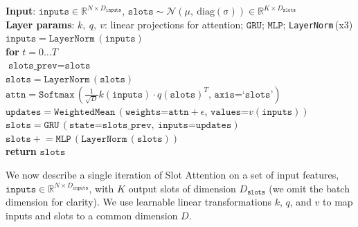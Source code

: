 \documentclass{article}
\newcommand{\softmax}[1]{\texttt{Softmax}\,(#1)}
\newcommand{\gru}[2]{\texttt{GRU}\,(#1, \ #2)}
\newcommand{\slots}[0]{\texttt{slots}}
\newcommand{\attn}[0]{\texttt{attn}}
\newcommand{\inp}[0]{\texttt{inputs}}
\newcommand{\mlp}[0]{\texttt{MLP}}
\newcommand{\updates}[0]{\texttt{updates}}
\newcommand{\layernorm}[0]{\texttt{LayerNorm}}
\begin{document}
\begin{algorithm}[t!]
\caption{Slot Attention module. The input is a set of $N$ vectors of dimension $D_{\inp}$ which is mapped to a set of $K$ slots of dimension $D_{\slots}$. We initialize the slots by sampling their initial values as independent samples from a Gaussian distribution with shared, learnable parameters $\mu\in\mathbb{R}^{D_{\slots}}$ and $\sigma\in\mathbb{R}^{D_{\slots}}$. In our experiments we set the number of iterations to $T=3$.}\label{algo:slot_attention}
\begin{algorithmic}[1]

  \STATE \textbf{Input}: $\inp\in\mathbb{R}^{N \times D_{\inp}}$, $\slots \sim \mathcal{N}(\mu, \ \mathrm{diag(\sigma)})\in\mathbb{R}^{K \times D_{\slots}}$\\[0.2em]
  \STATE \textbf{Layer params}: $k, \ q, \ v$: linear projections for attention; $\texttt{GRU}$; $\texttt{MLP}$;  \layernorm \,(x3)\\[0.2em]
  \STATE \quad $\inp = \layernorm\,(\inp)$\label{algo_step:norm_input}\\[0.2em]
  \STATE \quad \textbf{for} $t = 0\ldots T$ \\[0.2em]
  \STATE \qquad $\slots\texttt{\_prev} = \slots$\\[0.2em]
  \STATE \qquad $\slots = \layernorm\,(\slots)$\\[0.2em]
  \STATE \qquad $\attn = \softmax{\frac{1}{\sqrt{D}} k(\inp) \cdot q(\slots)^T,\,\texttt{axis=`slots'}} $  \hfill{}\label{algo_step:softmax}
  \STATE \qquad $\updates = \texttt{WeightedMean}\,(\texttt{weights=}\texttt{attn}+\epsilon,\,\texttt{values=}v(\inp))$  \hfill{}\label{algo_step:updates}\\[0.2em]
  \STATE \qquad $\slots = \gru{\texttt{state=}\slots\texttt{\_prev}}{\texttt{inputs=}\updates} $  \hfill{}\\[0.2em]
  \STATE \qquad $\slots \mathrel{+}= \mlp\,(\layernorm\,(\slots))$  \hfill{}\\[0.2em]
  \STATE \quad \textbf{return} $\slots$\label{algo_step:return}\\[0.2em]
\end{algorithmic}
\end{algorithm}

We now describe a single iteration of Slot Attention on a set of input features, $\inp\in\mathbb{R}^{N\times D_{\inp}}$, with $K$ output slots of dimension $D_{\slots}$ (we omit the batch dimension for clarity). We use learnable linear transformations $k$, $q$, and $v$ to map inputs and slots to a common dimension $D$.
\end{document}
